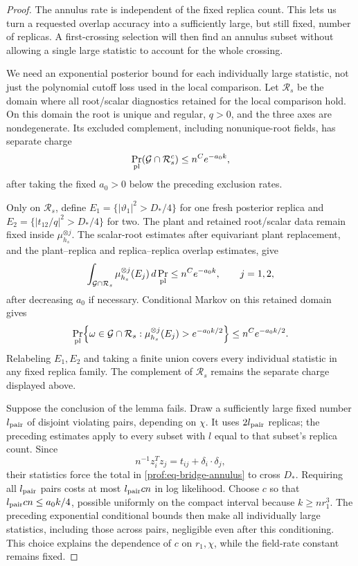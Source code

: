 \begin{proof}
The annulus rate is independent of the fixed replica count. This lets
us turn a requested overlap accuracy into a sufficiently large, but
still fixed, number of replicas. A first-crossing selection will then
find an annulus subset without allowing a single large statistic to
account for the whole crossing.

We need an exponential posterior bound for each individually large
statistic, not just the polynomial cutoff loss used in the local
comparison. Let \(\mathcal R_s\) be the domain where all root/scalar
diagnostics retained for the local comparison hold. On this domain the
root is unique and regular, \(q>0\), and the three axes are nondegenerate.
Its excluded complement, including nonunique-root fields, has separate charge
\[
 \Pr_{\rm pl}(\mathcal G\cap\mathcal R_s^c)\le n^Ce^{-a_0k},
\]
after taking the fixed \(a_0>0\) below the preceding exclusion rates.

Only on \(\mathcal R_s\), define
\(E_1=\{|\vartheta_1|^2>D_*/4\}\) for one fresh posterior replica and
\(E_2=\{|t_{12}/q|^2>D_*/4\}\) for two. The plant and retained
root/scalar data remain fixed inside \(\mu_{h_s}^{\otimes j}\).
The scalar-root estimates after equivariant plant replacement, and
the plant--replica and replica--replica overlap estimates, give
\[
 \int_{\mathcal G\cap\mathcal R_s}
       \mu_{h_s}^{\otimes j}(E_j)\,d\Pr_{\rm pl}
 \le n^Ce^{-a_0k},\qquad j=1,2,
\]
after decreasing \(a_0\) if necessary. Conditional Markov on this
retained domain gives
\[
 \Pr_{\rm pl}\!\left\{\omega\in\mathcal G\cap\mathcal R_s:
       \mu_{h_s}^{\otimes j}(E_j)>e^{-a_0k/2}\right\}
 \le n^Ce^{-a_0k/2}.
\]
Relabeling \(E_1,E_2\) and taking a finite union covers every
individual statistic in any fixed replica family. The complement of
\(\mathcal R_s\) remains the separate charge displayed above.

Suppose the conclusion of the lemma fails. Draw a sufficiently large
fixed number \(l_{\rm pair}\) of disjoint violating pairs, depending
on \(\chi\). It uses \(2l_{\rm pair}\) replicas; the preceding estimates
apply to every subset with \(l\) equal to that subset's replica count. Since
\[
 n^{-1}z_i^Tz_j=t_{ij}+\delta_i\cdot\delta_j,
\]
their statistics force the total in \eqref{prof:eq-bridge-annulus} to cross
\(D_*\). Requiring all \(l_{\rm pair}\) pairs costs at most
\(l_{\rm pair}c n\) in log likelihood. Choose \(c\) so that
\(l_{\rm pair}c n\le a_0k/4\), possible uniformly on the compact
interval because \(k\ge nr_1^3\).
The preceding exponential conditional bounds then make all
individually large statistics, including those across pairs,
negligible even after this conditioning. This choice explains the
dependence of \(c\) on \(r_1,\chi\), while the field-rate constant
remains fixed.


\end{proof}
